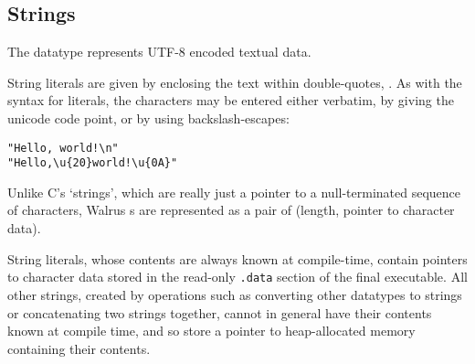 \subsection{Strings}\label{section:reference:strings}
The  datatype represents UTF-8 encoded textual data.

String literals are given by enclosing the text within double-quotes, . As with the syntax for  literals, the characters
may be entered either verbatim, by giving the unicode code point, or by using backslash-escapes:

\begin{verbatim}
"Hello, world!\n"           
"Hello,\u{20}world!\u{0A}" 
\end{verbatim}


Unlike C's `strings', which are really just a pointer to a null-terminated sequence
of characters, Walrus s are represented as a pair of (length, pointer to character data).

String literals, whose contents are always known at compile-time, contain pointers to character data stored in
the read-only \texttt{.data} section of the final executable. All other strings, created by operations such as
converting other datatypes to strings or concatenating two strings together, cannot in general have their contents
known at compile time, and so store a pointer to heap-allocated memory containing their contents.

